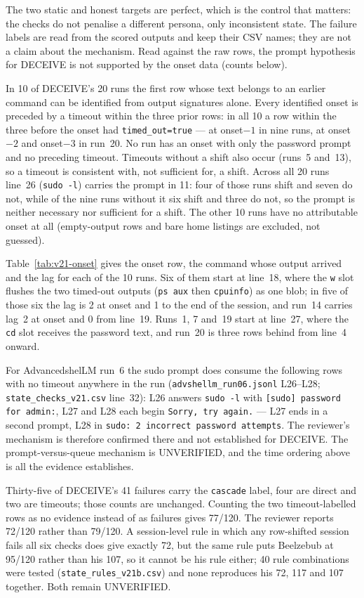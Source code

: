 \documentclass[a4paper,11pt]{article}
\begin{document}
The two static and honest targets are perfect, which is the control that matters:
the checks do not penalise a different persona, only inconsistent state. The
failure labels are read from the scored outputs and keep their CSV names; they
are not a claim about the mechanism. Read against the raw rows, the prompt
hypothesis for DECEIVE is not supported by the onset data (counts below).

In 10 of DECEIVE's 20 runs the first row whose text belongs to an earlier
command can be identified from output signatures alone. Every identified onset
is preceded by a timeout within the three prior rows: in all 10 a row within the
three before the onset had \texttt{timed\_out=true} --- at onset$-1$ in nine
runs, at onset$-2$ and onset$-3$ in run~20. No run has an onset with only the
password prompt and no preceding timeout. Timeouts without a shift also occur
(runs~5 and~13), so a timeout is consistent with, not sufficient for, a shift.
Across all 20 runs line~26 (\texttt{sudo -l}) carries the prompt in 11: four of
those runs shift and seven do not, while of the nine runs without it six shift
and three do not, so the prompt is neither necessary nor sufficient for a shift.
The other 10 runs have no attributable onset at all (empty-output rows and bare
home listings are excluded, not guessed).

Table~\ref{tab:v21-onset} gives the onset row, the command whose output arrived
and the lag for each of the 10 runs. Six of them start at line~18, where the
\texttt{w} slot flushes the two timed-out outputs (\texttt{ps aux} then
\texttt{cpuinfo}) as one blob; in five of those six the lag is 2 at onset and 1
to the end of the session, and run~14 carries lag~2 at onset and 0 from
line~19. Runs~1, 7 and~19 start at line~27, where the \texttt{cd} slot receives
the password text, and run~20 is three rows behind from line~4 onward.

For AdvancedshelLM run~6 the sudo prompt does consume the following rows with no
timeout anywhere in the run (\texttt{advshellm\_run06.jsonl} L26--L28;
\texttt{state\_checks\_v21.csv} line~32): L26 answers \texttt{sudo -l} with
\texttt{[sudo] password for admin:}, L27 and L28 each begin
\texttt{Sorry, try again.} --- L27 ends in a second prompt, L28 in
\texttt{sudo: 2 incorrect password attempts}. The reviewer's mechanism is
therefore confirmed there and not established for DECEIVE. The
prompt-versus-queue mechanism is UNVERIFIED, and the time ordering above is all
the evidence establishes.

Thirty-five of DECEIVE's 41 failures carry the \texttt{cascade} label, four are
direct and two are timeouts; those counts are unchanged. Counting the two
timeout-labelled rows as no evidence instead of as failures gives 77/120. The
reviewer reports 72/120 rather than 79/120. A session-level rule in which any
row-shifted session fails all six checks does give exactly 72, but the same rule
puts Beelzebub at 95/120 rather than his 107, so it cannot be his rule either;
40 rule combinations were tested (\texttt{state\_rules\_v21b.csv}) and none
reproduces his 72, 117 and 107 together. Both remain UNVERIFIED.
\end{document}
